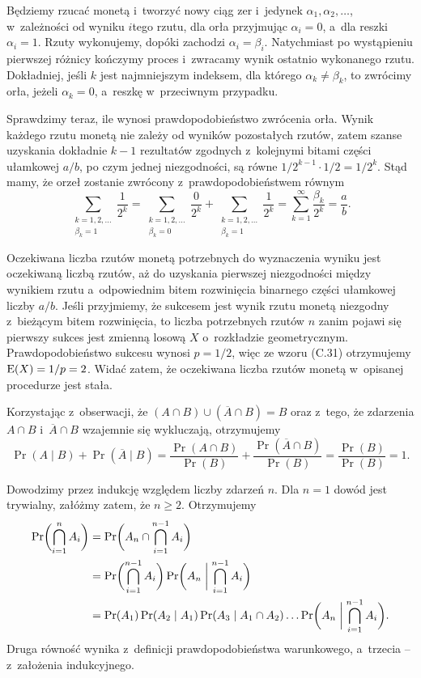 Będziemy rzucać monetą i~tworzyć nowy ciąg zer i~jedynek $\alpha_1,\alpha_2,\dots$, w~zależności od wyniku $i$\nbhyphen tego rzutu, dla orła przyjmując $\alpha_i=0$, a~dla reszki $\alpha_i=1$.
Rzuty wykonujemy, dopóki zachodzi $\alpha_i=\beta_i$.
Natychmiast po wystąpieniu pierwszej różnicy kończymy proces i~zwracamy wynik ostatnio wykonanego rzutu.
Dokładniej, jeśli $k$ jest najmniejszym indeksem, dla którego $\alpha_k\ne\beta_k$, to zwrócimy orła, jeżeli $\alpha_k=0$, a~reszkę w~przeciwnym przypadku.

Sprawdzimy teraz, ile wynosi prawdopodobieństwo zwrócenia orła.
Wynik każdego rzutu monetą nie zależy od wyników pozostałych rzutów, zatem szanse uzyskania dokładnie $k-1$ rezultatów zgodnych z~kolejnymi bitami części ułamkowej $a/b$, po czym jednej niezgodności, są równe $1/2^{k-1}\cdot1/2=1/2^k$.
Stąd mamy, że orzeł zostanie zwrócony z~prawdopodobieństwem równym
\[
    \sum_{\substack{k=1,2,\dots\\\beta_k=1}}\!\frac{1}{2^k} = \sum_{\substack{k=1,2,\dots\\\beta_k=0}}\!\frac{0}{2^k}+\sum_{\substack{k=1,2,\dots\\\beta_k=1}}\!\frac{1}{2^k} = \sum_{k=1}^\infty\frac{\beta_k}{2^k} = \frac{a}{b}.
\]

Oczekiwana liczba rzutów monetą potrzebnych do wyznaczenia wyniku jest oczekiwaną liczbą rzutów, aż do uzyskania pierwszej niezgodności między wynikiem rzutu a~odpowiednim bitem rozwinięcia binarnego części ułamkowej liczby $a/b$.
Jeśli przyjmiemy, że sukcesem jest wynik rzutu monetą niezgodny z~bieżącym bitem rozwinięcia, to liczba potrzebnych rzutów $n$ zanim pojawi się pierwszy sukces jest zmienną losową $X$ o~rozkładzie geometrycznym.
Prawdopodobieństwo sukcesu wynosi $p=1/2$, więc ze wzoru (C.31) otrzymujemy $\operatorname{E}(X)=1/p=2$.
Widać zatem, że oczekiwana liczba rzutów monetą w~opisanej procedurze jest stała.

\exercise %
Korzystając z~obserwacji, że $(A\cap B)\cup(\overline{A}\cap B)=B$ oraz z~tego, że zdarzenia $A\cap B$ i~$\overline{A}\cap B$ wzajemnie się wykluczają, otrzymujemy
\[
	\Pr(A\mid B)+\Pr(\overline{A}\mid B) = \frac{\Pr(A\cap B)}{\Pr(B)}+\frac{\Pr(\overline{A}\cap B)}{\Pr(B)} = \frac{\Pr(B)}{\Pr(B)} = 1.
\]

\exercise %
Dowodzimy przez indukcję względem liczby zdarzeń $n$.
Dla $n=1$ dowód jest trywialny, załóżmy zatem, że $n\ge2$.
Otrzymujemy
\begin{align*}
	\Pr\biggl(\bigcap_{i=1}^nA_i\biggr) &= \Pr\biggl(A_n\cap\bigcap_{i=1}^{n-1}A_i\biggr) \\
	&= \Pr\biggl(\bigcap_{i=1}^{n-1}A_i\biggr)\Pr\biggl(A_n\biggm|\bigcap_{i=1}^{n-1}A_i\biggr) \\
	&= \Pr(A_1)\Pr(A_2\mid A_1)\Pr(A_3\mid A_1\cap A_2)\dots\Pr\biggl(A_n\biggm|\bigcap_{i=1}^{n-1}A_i\biggr).
\end{align*}
Druga równość wynika z~definicji prawdopodobieństwa warunkowego, a~trzecia -- z~założenia indukcyjnego.

